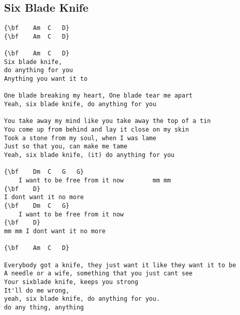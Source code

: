 \documentclass[a4paper]{article}
\begin{document}
\subsection{Six Blade Knife} %
\label{sub:Six Blade Knife}
\begin{Verbatim}[commandchars=\\\{\}]
{\bf  	Am	C	D}
{\bf  	Am	C	D}

{\bf  	Am	C	D}
Six blade knife,	 
do anything for you	 
Anything you want it to

One blade breaking my heart, One blade tear me apart
Yeah, six blade knife, do anything for you

You take away my mind like you take away the top of a tin
You come up from behind and lay it close on my skin
Took a stone from my soul, when I was lame
Just so that you, can make me tame
Yeah, six blade knife, (it) do anything for you

{\bf  	Dm	C	G	G}
 	I want to be free from it now	   	 mm mm
{\bf  	D}
I dont want it no more
{\bf  	Dm	C	G}
 	I want to be free from it now	 
{\bf  	D}
mm mm I	dont want it no more

{\bf  	Am	C	D}

Everybody got a knife, they just want it like they want it to be
A needle or a wife, something that you just cant see
Your sixblade knife, keeps you strong
It'll do me wrong,
yeah, six blade knife, do anything for you.
do any thing, anything
\end{Verbatim}
\newpage
\end{document}
